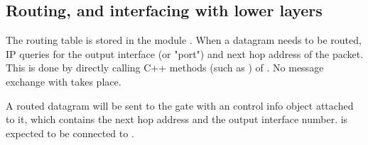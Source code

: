 % 
% 
% 
% 
% 
% 
% 

\subsection{Routing, and interfacing with lower layers}

The routing table is stored in the module . When a
datagram needs to be routed, IP queries  for the
output interface (or "port") and next hop address of the packet. This is
done by directly calling C++ methods (such as
) of . No
message exchange with  takes place.

A routed datagram will be sent to the  gate with an
 control info object attached to it, which
contains the next hop address and the output interface number.
 is expected to be connected to .

